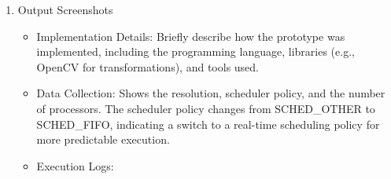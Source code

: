 \documentclass[a4paper,11pt]{article}%
\newenvironment{qanda}{\setlength{\parindent}{0pt}}{\bigskip}
\begin{document}
\begin{qanda}
\begin{enumerate}
\begin{enumerate}
\begin{itemize}
				      \end{itemize}
				\item Output Screenshots
				      \begin{itemize}
					      \item Implementation Details: Briefly describe how the prototype was implemented, including the programming language, libraries (e.g., OpenCV for transformations), and tools used.
					      \item Data Collection: Shows the resolution, scheduler policy, and the number of processors. The scheduler policy changes from SCHED\_OTHER to SCHED\_FIFO, indicating a switch to a real-time scheduling policy for more predictable execution.

					      \item Execution Logs:


\end{itemize}
\end{enumerate}
\end{enumerate}
\end{qanda}
\end{document}
